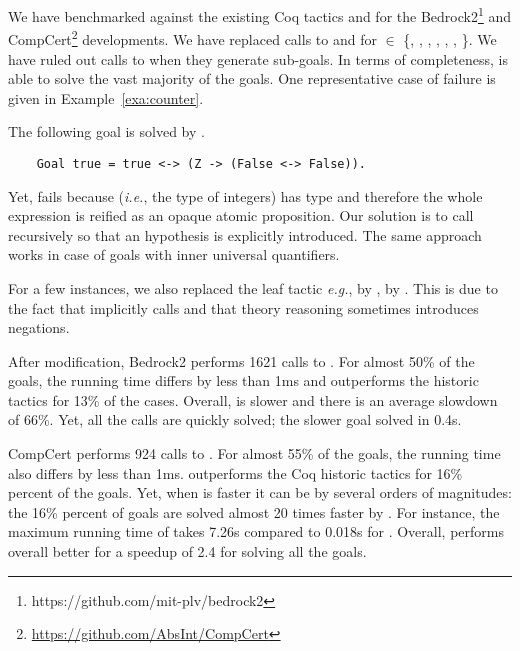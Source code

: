 \documentclass[utf8,a4paper,UKenglish,cleveref, autoref, thm-restate]{lipics-v2019}
\begin{document}
We have benchmarked  against the existing Coq tactics
 and  for the
Bedrock2\footnote{https://github.com/mit-plv/bedrock2} and
CompCert\footnote{\url{https://github.com/AbsInt/CompCert}}
developments.
%
We have replaced calls to  and  for
 $\in$ \{, ,
, , , ,
 \}.
%
We have ruled out calls to  when they generate sub-goals.
%
In  terms of  completeness,   is able  to solve  the vast
majority  of the  goals.  One
representative case of failure is given in Example~\ref{exa:counter}. 
\begin{example} The following goal is solved by .
  \label{exa:counter}
  \begin{verbatim}
    Goal true = true <-> (Z -> (False <-> False)).
  \end{verbatim}
  Yet,  fails because  (\emph{i.e.},
  the type of integers) has type  and therefore the whole
  expression  is reified as an opaque
  atomic proposition. Our solution is to call 
  recursively so that an hypothesis  is explicitly
  introduced. The same approach works in case of goals with inner
  universal quantifiers.
\end{example}
For a few instances, we also replaced the leaf tactic \emph{e.g.},
 by ,  by
. This is due to the fact that 
implicitly calls  and that theory reasoning
sometimes introduces negations.

After modification, Bedrock2 performs 1621 calls to . For
almost 50\% of the goals, the running time differs by less than 1ms and
 outperforms the historic tactics for 13\% of the
cases. Overall,  is slower and there is an average slowdown of 66\%.
Yet, all the calls are quickly solved; the slower goal solved in 0.4s.

CompCert performs 924 calls to .  For almost 55\% of the
goals, the running time also differs by less than 1ms. 
outperforms the Coq historic tactics for 16\% percent of the
goals. Yet, when  is faster it can be by several orders
of magnitudes: the 16\% percent of goals are solved almost 20 times
faster by .
%
For instance, the maximum running time of  takes 7.26s
compared to 0.018s for . Overall,  performs
overall better for a speedup of 2.4 for solving all the goals.
\end{document}
